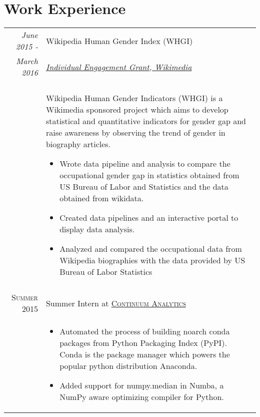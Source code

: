 \documentclass[a4paper,10pt]{article}
\begin{document}
\section{Work Experience}
\begin{tabular}{r|p{12cm}}


    \emph{June 2015 - } & Wikipedia Human Gender Index (WHGI) \\\emph{March 2016}&
    \emph{\href{https://meta.wikimedia.org/wiki/Grants:IEG/WIGI:_Wikipedia_Gender_Index}{Individual
    Engagement Grant, Wikimedia}}\\& \\&
            Wikipedia Human Gender Indicators (WHGI)
            is a Wikimedia sponsored project which aims to
            develop statistical and quantitative indicators for gender gap
            and raise awareness by observing the trend of gender in biography
            articles.
        \begin{itemize}
            \item Wrote data pipeline and analysis to compare the occupational
                gender gap in statistics obtained from US Bureau of Labor and
                Statistics and the data obtained from wikidata.
            \item Created data pipelines and an interactive portal to display data analysis.
            \item Analyzed and compared the occupational data from Wikipedia
                biographies with the data provided by US Bureau of Labor Statistics
        \end{itemize}

\\\multicolumn{2}{c}{} \\


\textsc{Summer 2015} & Summer Intern at
\textsc{\href{http://continuum.io/}{Continuum Analytics}}
    \emph{}\\&
    \begin{itemize}
        \item Automated the process of building noarch conda packages from Python
    Packaging Index (PyPI). Conda is the package manager which powers the
    popular python distribution Anaconda.
        \item Added support for numpy.median in Numba, a NumPy aware optimizing compiler
    for Python.
    \end{itemize}


\end{tabular}
\end{document}

